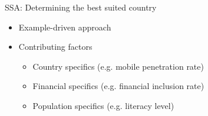 \documentclass[10pt]{beamer}
\begin{document}
\begin{frame}{SSA: Determining the best suited country}
    \vspace{.5cm}
    \begin{itemize}
        \item Example-driven approach
        \item Contributing factors
        \begin{itemize}
            \item Country specifics (e.g. mobile penetration rate)
            \item Financial specifics (e.g. financial inclusion rate)
            \item Population specifics (e.g. literacy level)
        \end{itemize}
    \end{itemize}
\end{frame}
\end{document}
